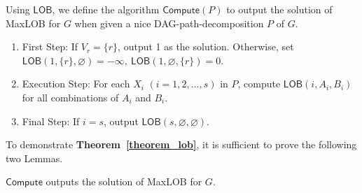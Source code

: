 \documentclass[runningheads]{llncs}
\theoremstyle{plain}
\theoremstyle{definition}
\begin{document}
Using $\mathsf{LOB}$, we define the algorithm $\mathsf{Compute}(P)$ to output the solution of MaxLOB for $G$ when given a nice DAG-path-decomposition $P$ of $G$.


\begin{enumerate}
    \item First Step: If $V_r = \{r\}$, output 1 as the solution. Otherwise, set \\$\mathsf{LOB}(1, \{r\}, \varnothing) = -\infty, ~\mathsf{LOB}(1, \varnothing, \{r\}) = 0$.
    \item Execution Step: For each $X_i$ $(i=1, 2, ..., s)$ in $P$, compute $\mathsf{LOB}(i, A_i, B_i)$ for all combinations of $A_i$ and $B_i$.
    \item Final Step: If $i = s$, output $\mathsf{LOB}(s, \varnothing, \varnothing)$.
\end{enumerate}

To demonstrate \textbf{Theorem~\ref{theorem_lob}}, it is sufficient to prove the following two Lemmas.

\begin{lemma}\label{lob}
    $\mathsf{Compute}$ outputs the solution of MaxLOB for $G$.
\end{lemma}
\end{document}
